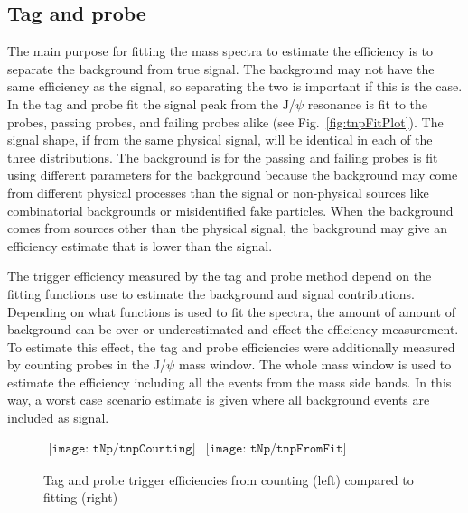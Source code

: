     \subsection{Tag and probe}
      The main purpose for fitting the mass spectra to estimate the efficiency
        is to separate the background from true signal. 
      The background may not have the same efficiency as the signal, so 
        separating the two is important if this is the case.
      In the tag and probe fit the signal peak from the J/$\psi$ resonance
        is fit to the probes, passing probes, and failing probes alike (see
        Fig.~\ref{fig:tnpFitPlot}). 
      The signal shape, if from the same physical signal, will be 
        identical in each of the three distributions. 
      The background is for the passing and failing probes is fit using 
        different parameters for the background because the background
        may come from different physical processes than the signal or 
        non-physical sources like combinatorial backgrounds or misidentified
        fake particles.
      When the background comes from sources other than the physical signal,
        the background may give an efficiency estimate that is lower than
        the signal. 

      The trigger efficiency measured by the tag and probe method depend on
        the fitting functions use to estimate the background and signal 
        contributions. 
      Depending on what functions is used to fit the spectra, the amount of
        amount of background can be over or underestimated and effect the 
        efficiency measurement.
      To estimate this effect, the tag and probe efficiencies were additionally
        measured by counting probes in the J/$\psi$ mass window. 
      The whole mass window is used to estimate the efficiency including all 
        the events from the mass side bands.
      In this way, a worst case scenario estimate is given where all background
        events are included as signal. 
      \begin{figure}[!Hhbt]
        \centering
        $ \begin{array}{cc}
          \texttt{[image: tNp/tnpCounting]} &
          \texttt{[image: tNp/tnpFromFit]}
        \end{array} $ 
        \caption{Tag and probe trigger efficiencies from counting (left) 
          compared to fitting (right)}
        \label{fig:tnpCntVFit}
      \end{figure}

